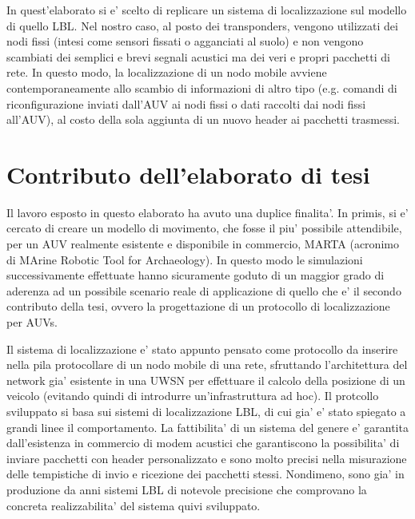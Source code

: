 \par
In quest'elaborato si e' scelto di replicare un sistema di localizzazione sul modello di quello LBL. Nel nostro caso, al posto dei transponders, vengono utilizzati dei nodi fissi (intesi come sensori fissati o agganciati al suolo) e non vengono scambiati dei semplici e brevi segnali acustici ma dei veri e propri pacchetti di rete. In questo modo,  la localizzazione di un nodo mobile avviene contemporaneamente allo scambio di informazioni di altro tipo (e.g. comandi di riconfigurazione inviati dall'AUV ai nodi fissi o dati raccolti dai nodi fissi all'AUV), al costo della sola aggiunta di un nuovo header ai pacchetti trasmessi.  

\section{Contributo dell'elaborato di tesi}
Il lavoro esposto in questo elaborato ha avuto una duplice finalita'.
In primis, si e' cercato di creare un modello di movimento, che fosse il piu' possibile attendibile, per un AUV realmente esistente e disponibile in commercio, MARTA (acronimo di MArine Robotic Tool for Archaeology). In questo modo le simulazioni successivamente effettuate hanno sicuramente goduto di un maggior grado di aderenza ad un possibile scenario reale di applicazione di quello che e' il secondo contributo della tesi, ovvero la progettazione di un protocollo di localizzazione per AUVs.
\par
Il sistema di localizzazione e' stato appunto pensato come protocollo da inserire nella pila protocollare di un nodo mobile di una rete, sfruttando l'architettura del network gia' esistente in una UWSN per effettuare il calcolo della posizione di un veicolo (evitando quindi di introdurre un'infrastruttura ad hoc).
Il protcollo sviluppato si basa sui sistemi di localizzazione LBL, di cui gia' e' stato spiegato a grandi linee il comportamento. La fattibilita' di un sistema del genere e' garantita dall'esistenza in commercio di modem acustici che garantiscono la possibilita' di inviare pacchetti con header personalizzato e sono molto precisi nella misurazione delle tempistiche di invio e ricezione dei pacchetti stessi. Nondimeno, sono gia' in produzione da anni sistemi LBL di notevole precisione \cite{lblsonardyne} che comprovano la concreta realizzabilita' del sistema quivi sviluppato.
